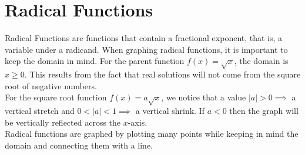 \section{Radical Functions}

    Radical Functions are functions that contain a fractional exponent, that is, a variable
    under a radicand. When graphing radical functions, it is important to keep the domain in
    mind. For the parent function $f(x)=\sqrt{x}$, the domain is $x\geq 0$. This results from
    the fact that real solutions will not come from the square root of negative numbers. \\

    \noindent For the square root function $f(x)=a\sqrt{x}$, we notice that a value
    $|a|>0\implies$ a vertical stretch and $0<|a|<1\implies$ a vertical shrink. If $a<0$ then
    the graph will be vertically reflected across the $x$-axis. \\

    \noindent Radical functions are graphed by plotting many points while keeping in mind the
    domain and connecting them with a line.